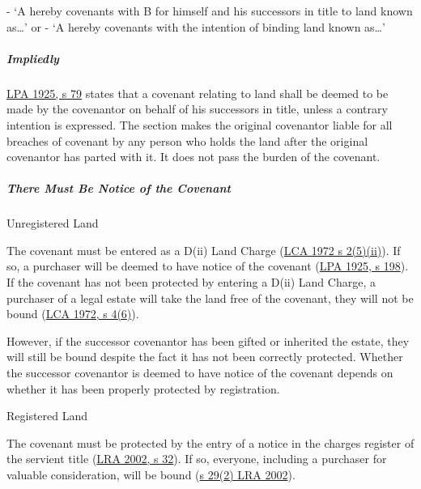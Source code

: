 \documentclass[
]{article}
\newenvironment{Shaded}{}{}
\newcommand{\NormalTok}[1]{#1}
\begin{document}
\begin{Shaded}
\begin{Highlighting}[]
\NormalTok{{-} ‘A hereby covenants with B for himself and his successors in title to land known as…’ or}
\NormalTok{{-} ‘A hereby covenants with the intention of binding land known as…’}
\end{Highlighting}
\end{Shaded}

\hypertarget{impliedly}{%
\subparagraph{Impliedly}\label{impliedly}}

\href{https://www.legislation.gov.uk/ukpga/Geo5/15-16/20/section/79}{LPA
1925, s 79} states that a covenant relating to land shall be deemed to
be made by the covenantor on behalf of his successors in title, unless a
contrary intention is expressed. The section makes the original
covenantor liable for all breaches of covenant by any person who holds
the land after the original covenantor has parted with it. It does not
pass the burden of the covenant.

\hypertarget{there-must-be-notice-of-the-covenant}{%
\subparagraph{There Must Be Notice of the
Covenant}\label{there-must-be-notice-of-the-covenant}}

Unregistered Land

The covenant must be entered as a D(ii) Land Charge
(\href{https://www.legislation.gov.uk/ukpga/1972/61/section/2}{LCA 1972
s 2(5)(ii)}). If so, a purchaser will be deemed to have notice of the
covenant
(\href{https://www.legislation.gov.uk/ukpga/Geo5/15-16/20/section/198}{LPA
1925, s 198}). If the covenant has not been protected by entering a
D(ii) Land Charge, a purchaser of a legal estate will take the land free
of the covenant, they will not be bound
(\href{https://www.legislation.gov.uk/ukpga/1972/61/section/4}{LCA 1972,
s 4(6)}).

However, if the successor covenantor has been gifted or inherited the
estate, they will still be bound despite the fact it has not been
correctly protected. Whether the successor covenantor is deemed to have
notice of the covenant depends on whether it has been properly protected
by registration.

Registered Land

The covenant must be protected by the entry of a notice in the charges
register of the servient title
(\href{https://www.legislation.gov.uk/ukpga/2002/9/section/32}{LRA 2002,
s 32}). If so, everyone, including a purchaser for valuable
consideration, will be bound
(\href{https://www.legislation.gov.uk/ukpga/2002/9/section/29}{s 29(2)
LRA 2002}).
\end{document}
